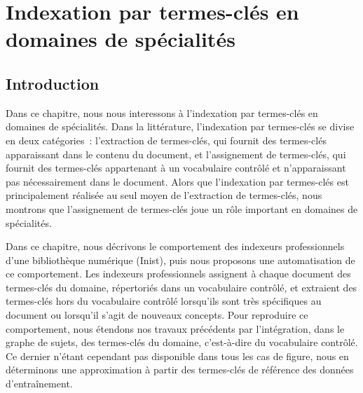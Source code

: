 \chapter{Indexation par termes-clés en domaines de spécialités}
\label{chap:main-domain_specific_keyphrase_annotation}


  \section{Introduction}
  \label{sec:main:domain_specific_keyphrase_annotation-introduction}
    Dans ce chapitre, nous nous interessons à l'indexation par
    termes-clés en domaines de spécialités. Dans la littérature, l'indexation
    par termes-clés se divise en deux catégories~: l'extraction de termes-clés,
    qui fournit des termes-clés apparaissant dans le contenu du document, et
    l'assignement de termes-clés, qui fournit des termes-clés appartenant à un
    vocabulaire contrôlé et n'apparaissant pas nécessairement dans le document.
    Alors que l'indexation par termes-clés est principalement réalisée au seul
    moyen de l'extraction de termes-clés, nous montrons que l'assignement de
    termes-clés joue un rôle important en domaines de spécialités.

    Dans ce chapitre, nous décrivons le comportement des indexeurs
    professionnels d'une bibliothèque numérique (Inist), puis nous proposons une
    automatisation de ce comportement. Les indexeurs professionnels assignent à
    chaque document des termes-clés du domaine, répertoriés dans un vocabulaire
    contrôlé, et extraient des termes-clés hors du vocabulaire contrôlé
    lorsqu'ils sont très spécifiques au document ou lorsqu'il s'agit de nouveaux
    concepts. Pour reproduire ce comportement, nous étendons nos travaux
    précédents par l'intégration, dans le graphe de sujets, des termes-clés du
    domaine, c'est-à-dire du vocabulaire contrôlé. Ce dernier n'étant cependant
    pas disponible dans tous les cas de figure, nous en déterminons une
    approximation à partir des termes-clés de référence des données
    d'entraînement.

